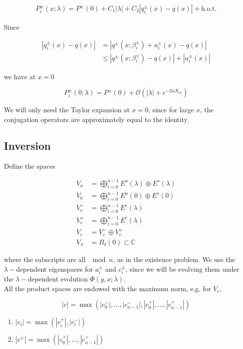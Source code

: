 \documentclass[12pt]{article}
\def\C{{\mathbb C}}
\begin{document}
\begin{align*}
P_i^\pm(x; \lambda) = P^\pm(0) + C_1 |\lambda| 
+ C_2| q_i^\pm(x) - q(x) | + \text{h.o.t.}
\end{align*}

Since 

\begin{align*}
| q_i^\pm(x) - q(x) | &= | q^\pm(x; \beta_i^\pm) + u_i^\pm(x) - q(x) | \\
&\leq |q^\pm(x; \beta_i^\pm) - q(x)| + |u_i^\pm(x)|
\end{align*}

we have at $x = 0$

\begin{equation}\label{PTaylor}
P_i^\pm(0; \lambda) = P^\pm(0) + \mathcal{O}(|\lambda| + e^{-2 \alpha X_m})
\end{equation}

We will only need the Taylor expansion at $x = 0$, since for large $x$, the conjugation operators are approximately equal to the identity.

\subsection{Inversion}

Define the spaces

\begin{align*}
V_a &= \bigoplus_{i=0}^{n-1} E^u(\lambda) \oplus E^s(\lambda) \\
V_b &= \bigoplus_{i=0}^{n-1} E^u(0) \oplus E^s(0) \\
V_c^- &= \bigoplus_{i=0}^{n-1} E^c(\lambda) \\
V_c^+ &= \bigoplus_{i=0}^{n-1} E^c(\lambda) \\
V_c &= V_c^- \oplus V_c^+ \\
V_\lambda &= B_\delta(0) \subset \C
\end{align*}

where the subscripts are all $\mod n$, as in the existence problem. We use the $\lambda-$dependent eigenspaces for $a_i^\pm$ and $c_i^\pm$, since we will be evolving them under the $\lambda-$dependent evolution $\Phi(y, x; \lambda)$.\\

All the product spaces are endowed with the maximum norm, e.g. for $V_c$, 

\[
|c| = \max(|c_0^-|, \dots, |c_{n-1}^-|, |c_0^+|, \dots, |c_{n-1}^+|)
\]

\begin{enumerate}
	\item $|c_i| = \max(|c_i^+|, |c_i^-|)$ 
	\item $|c^+| = \max(|c_0^+|, \dots, |c_{n-1}^+|)$
\end{enumerate}
\end{document}
